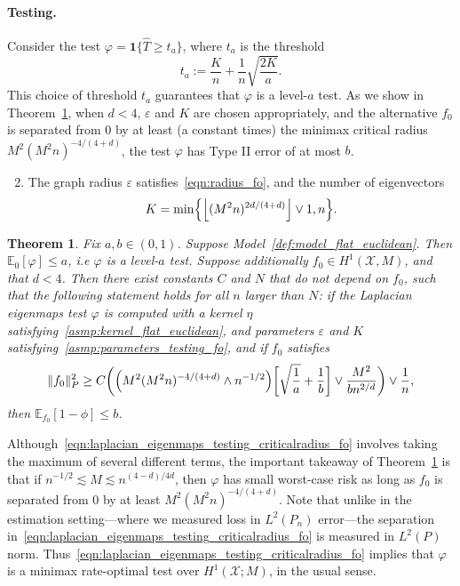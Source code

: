 \documentclass{article}
\newcommand{\floor}[1]{\left\lfloor #1 \right\rfloor}
\newcommand{\1}{\mathbf{1}}
\newcommand{\mc}[1]{\mathcal{#1}}
\newcommand{\Ebb}{\mathbb{E}}
\newcommand{\wh}[1]{\widehat{#1}}
\theoremstyle{alden}
\theoremstyle{aldenthm}
\newtheorem{theorem}{Theorem}
\theoremstyle{definition}
\theoremstyle{remark}
\begin{document}
\paragraph{Testing.} Consider the test $\varphi = \1\{\wh{T} \geq t_{a}\}$, where $t_{a}$ is the threshold
\begin{equation*}
t_{a} := \frac{K}{n} + \frac{1}{n}\sqrt{\frac{2K}{a}}.
\end{equation*}
This choice of threshold $t_{a}$ guarantees that $\varphi$ is a level-$a$ test. As we show in Theorem~\ref{thm:laplacian_eigenmaps_testing_fo}, when $d < 4$, $\varepsilon$ and $K$ are chosen appropriately, and the alternative $f_0$ is separated from $0$ by at least (a constant times) the minimax critical radius $M^2(M^2n)^{-4/(4 + d)}$, the test $\varphi$ has Type II error of at most $b$.

\begin{enumerate}[label=(P\arabic*)]
	\setcounter{enumi}{1}
	\item 
	\label{asmp:parameters_testing_fo}
	The graph radius $\varepsilon$ satisfies~\eqref{eqn:radius_fo}, and the number of eigenvectors 
	\begin{equation}
	\label{eqn:eigenvector_testing_fo}
	K = \min\Bigl\{\floor{(M^2n)^{2d/(4 + d)}} \vee 1, n\Bigr\}.
	\end{equation}
\end{enumerate}
\begin{theorem}
	\label{thm:laplacian_eigenmaps_testing_fo}
	Fix $a,b \in (0,1)$. Suppose Model~\ref{def:model_flat_euclidean}. Then $\mathbb{E}_0[\varphi] \leq a$, i.e $\varphi$ is a level-$a$ test. Suppose additionally $f_0 \in H^1(\mc{X},M)$, and that $d < 4$. Then there exist constants $C$ and $N$ that do not depend on $f_0$, such that the following statement holds for all $n$ larger than $N$: if the Laplacian eigenmaps test $\varphi$ is computed with a kernel $\eta$ satisfying~\ref{asmp:kernel_flat_euclidean}, and parameters $\varepsilon$ and $K$ satisfying~\ref{asmp:parameters_testing_fo}, and if $f_0$ satisfies
	\begin{equation}
	\label{eqn:laplacian_eigenmaps_testing_criticalradius_fo}
	\|f_0\|_P^2 \geq C\biggl(\Bigl(M^2(M^2n)^{-4/(4 + d) } \wedge n^{-1/2}\Bigr)\biggl[\sqrt{\frac{1}{a}} + \frac{1}{b}\biggr] \vee \frac{M^2}{b n^{2/d}} \biggr) \vee \frac{1}{n},
	\end{equation}
	then $\Ebb_{f_0}[1 - \phi] \leq b$.
\end{theorem}
Although~\eqref{eqn:laplacian_eigenmaps_testing_criticalradius_fo} involves taking the maximum of several different terms, the important takeaway of Theorem~\ref{thm:laplacian_eigenmaps_testing_fo} is that if $n^{-1/2} \lesssim M \lesssim n^{(4 - d)/4d}$, then $\varphi$ has small worst-case risk as long as $f_0$ is separated from $0$ by at least $M^2(M^2n)^{-4/(4 + d)}$. Note that unlike in the estimation setting---where we measured loss in $L^2(P_n)$ error---the separation in~\eqref{eqn:laplacian_eigenmaps_testing_criticalradius_fo} is measured in $L^2(P)$ norm. Thus~\eqref{eqn:laplacian_eigenmaps_testing_criticalradius_fo} implies that $\varphi$ is a minimax rate-optimal test over $H^1(\mc{X};M)$, in the usual sense.
\end{document}
